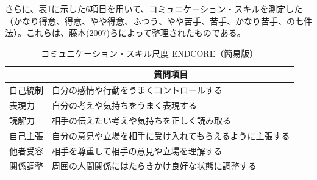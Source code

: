 \documentclass[11pt, a4paper]{jreport} %
\begin{document}
さらに、表\ref{tab:daibo3}に示した6項目を用いて、コミュニケーション・スキルを測定した（かなり得意、得意、やや得意、ふつう、やや苦手、苦手、かなり苦手、の七件法）。これらは、藤本(2007)らによって整理されたものである\cite{2007}。
\begin{table}[H]
\caption{コミュニケーション・スキル尺度 ENDCORE（簡易版）\cite{2007}}
\label{tab:daibo3}
\centering
\begin{tabular}{@{}ll@{}}
\toprule
\multicolumn{1}{c}{} & \multicolumn{1}{c}{質問項目}     \\ \midrule
自己統制                 & 自分の感情や行動をうまくコントロールする         \\
表現力                  & 自分の考えや気持ちをうまく表現する            \\
読解力                  & 相手の伝えたい考えや気持ちを正しく読み取る        \\
自己主張                 & 自分の意見や立場を相手に受け入れてもらえるように主張する \\
他者受容                 & 相手を尊重して相手の意見や立場を理解する         \\
関係調整                 & 周囲の人間関係にはたらきかけ良好な状態に調整する     \\ \bottomrule
\end{tabular}
\end{table}
\end{document}
